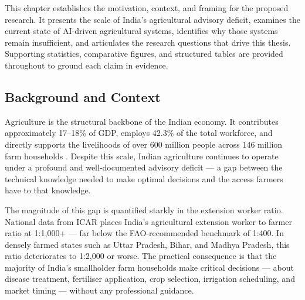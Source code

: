 \documentclass[12pt,a4paper]{article}
\providecommand{\textrupee}{Rs.~}
\begin{document}
This chapter establishes the motivation, context, and framing for the proposed research. It presents the scale of India's agricultural advisory deficit, examines the current state of AI-driven agricultural systems, identifies why those systems remain insufficient, and articulates the research questions that drive this thesis. Supporting statistics, comparative figures, and structured tables are provided throughout to ground each claim in evidence.

\subsection{Background and Context}
Agriculture is the structural backbone of the Indian economy. It contributes approximately 17--18\% of GDP, employs 42.3\% of the total workforce, and directly supports the livelihoods of over 600 million people across 146 million farm households \cite{census2021}. Despite this scale, Indian agriculture continues to operate under a profound and well-documented advisory deficit --- a gap between the technical knowledge needed to make optimal decisions and the access farmers have to that knowledge.

The magnitude of this gap is quantified starkly in the extension worker ratio. National data from ICAR \cite{icar2023} places India's agricultural extension worker to farmer ratio at 1:1,000+ --- far below the FAO-recommended benchmark of 1:400. In densely farmed states such as Uttar Pradesh, Bihar, and Madhya Pradesh, this ratio deteriorates to 1:2,000 or worse. The practical consequence is that the majority of India's smallholder farm households make critical decisions --- about disease treatment, fertiliser application, crop selection, irrigation scheduling, and market timing --- without any professional guidance.

\end{document}
